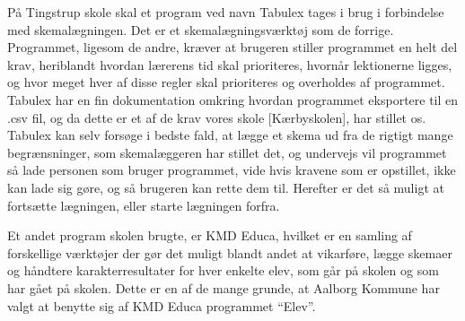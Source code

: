 På Tingstrup skole skal et program ved navn Tabulex tages i brug i forbindelse med skemalægningen. Det er et skemalægningsværktøj som de forrige. Programmet, ligesom de andre, kræver at brugeren stiller programmet en helt del krav, heriblandt hvordan lærerens tid skal prioriteres, hvornår lektionerne ligges, og hvor meget hver af disse regler skal prioriteres og overholdes af programmet\cite{Tabulex}. Tabulex har en fin dokumentation omkring hvordan programmet eksportere til en .csv fil, og da dette er et af de krav vores skole [Kærbyskolen], har stillet os. Tabulex kan selv forsøge i bedste fald, at lægge et skema ud fra de rigtigt mange begrænsninger, som skemalæggeren har stillet det, og undervejs vil programmet så lade personen som bruger programmet, vide hvis kravene som er opstillet, ikke kan lade sig gøre, og så brugeren kan rette dem til. Herefter er det så muligt at fortsætte lægningen, eller starte lægningen forfra.

Et andet program skolen brugte, er KMD Educa, hvilket er en samling af forskellige værktøjer\cite{KMD} der gør det muligt blandt andet at vikarføre, lægge skemaer og håndtere karakterresultater for hver enkelte elev, som går på skolen og som har gået på skolen. Dette er en af de mange grunde, at Aalborg Kommune har valgt at benytte sig af KMD Educa programmet ``Elev''\cite{useCase_KMD_Educa_Elev}.